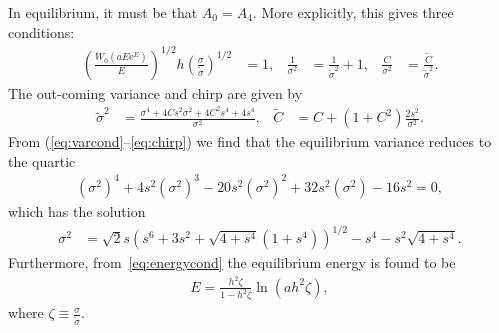 In equilibrium, it must be that $A_0 = A_4$. More explicitly, this gives three conditions:
\begin{align}
\label{eq:energycond}
	\left( \frac{W_0(a E \textrm{e}^E)}{E} \right)^{1/2} h \left( \frac{\sigma}{\widetilde{\sigma}} \right)^{1/2} &= 1,& \frac{1}{\sigma^2} &= \frac{1}{\widetilde{\sigma}^2} + 1,& \frac{C}{\sigma^2} &= \frac{\widetilde{C}}{\widetilde{\sigma}^2}.
\end{align}
The out-coming variance and chirp are given by \cite{agrawal2013}
\begin{align}
\label{eq:variance}
	\widetilde{\sigma}^2 &= \frac{\sigma^4 + 4 C s^2 \sigma^2 + 4 C^2 s^4 +4s^4}{\sigma^2},& \widetilde{C} &= C + \left( 1 + C^2 \right) \frac{2s^2}{\sigma^2}.
\end{align}
From (\ref{eq:varcond}--\ref{eq:chirp}) we find that the equilibrium variance reduces to the quartic
\begin{align*}
\left( \sigma^2 \right)^4 + 4 s^2 \left( \sigma^2 \right)^3 - 20 s^2 \left( \sigma^2 \right)^2 + 32 s^2 \left( \sigma^2 \right) - 16 s^2 = 0,
\end{align*}
which has the solution
\begin{align*}
\sigma^2 &= \sqrt{2} s \left( s^6 + 3s^2 + \sqrt{4 + s^4}(1 + s^4) \right)^{1/2} - s^4 - s^2 \sqrt{4 + s^4}.
\end{align*}
Furthermore, from~\eqref{eq:energycond} the equilibrium energy is found to be
\begin{align}
	\label{eq:equilenergy}
	E = \frac{h^2 \zeta}{1 - h^2 \zeta} \ln \left( a h^2 \zeta \right),
\end{align}
where $\displaystyle \zeta \equiv \frac{\sigma}{\widetilde{\sigma}}$.
